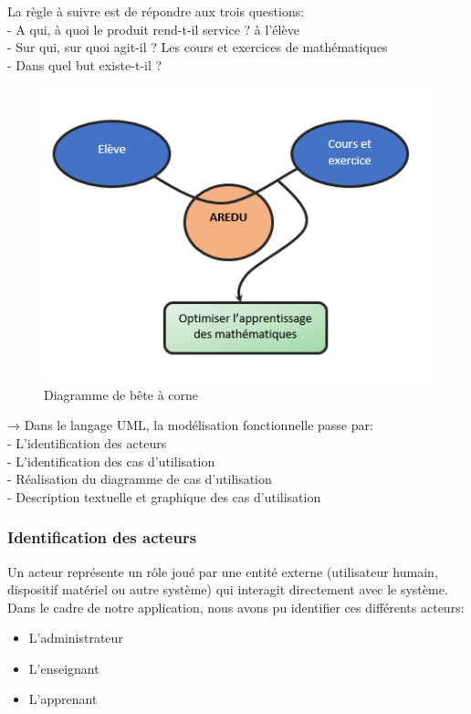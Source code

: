 	La règle à suivre est de répondre aux trois questions: \\
	- A qui, à quoi le produit rend-t-il service ? à l’élève \\
	- Sur qui, sur quoi agit-il ? Les cours et exercices de mathématiques \\
	- Dans quel but existe-t-il ? 
\begin{figure}[hbtp]
\centering
\includegraphics[scale=1]{img/DBaC.png}
\caption{Diagramme de bête à corne}
\end{figure}

\noindent

→ Dans le langage UML, la modélisation fonctionnelle passe par: \\
	- L’identification des acteurs \\
	- L’identification des cas d’utilisation \\
	- Réalisation du diagramme de cas d’utilisation \\
	- Description textuelle et graphique des cas d’utilisation 


\subsubsection{Identification des acteurs}
	Un acteur représente un rôle joué par une entité externe (utilisateur humain, dispositif matériel ou autre système) qui interagit directement avec le système. Dans le cadre de notre application, nous avons pu identifier ces différents acteurs: 
	\begin{itemize}
		\item L’administrateur 
		\item L’enseignant 
		\item L’apprenant
	\end{itemize}
